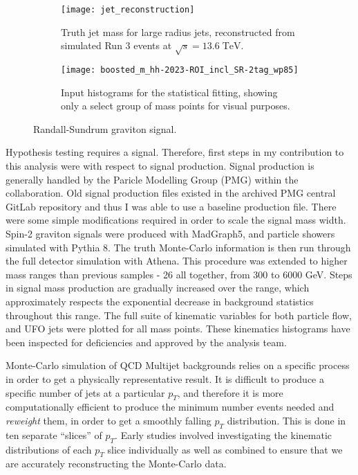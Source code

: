 \documentclass[12pt]{article}
\newcommand{\un}[1]{\;\text{#1}}
\begin{document}
\begin{figure}[t]
    \centering
    \begin{subfigure}[t]{.48\textwidth}
        \centering
        \texttt{[image: jet\_reconstruction]}
        \caption{Truth jet mass for large radius jets, reconstructed from
        simulated Run 3 events at $\sqrt{s}=13.6\un{TeV}$.}
        \label{subfig:jet_reconstruction}
    \end{subfigure}
    \hfill
    \begin{subfigure}[t]{.48\textwidth}
        \centering
        \texttt{[image: boosted\_m\_hh-2023-ROI\_incl\_SR-2tag\_wp85]}
        \caption{Input histograms for the statistical fitting, showing only a
        select group of mass points for visual purposes.}
        \label{subfig:input_hists}
    \end{subfigure}
    \caption{Randall-Sundrum graviton signal.}
\label{fig:my_contributions}
\end{figure}
Hypothesis testing requires a signal. Therefore, first steps in my contribution
to this analysis were with respect to signal production. Signal production is
generally handled by the Paricle Modelling Group (PMG) within the
collaboration. Old signal production files existed in the archived PMG central
GitLab repository and thus I was able to use a baseline production file. There
were some simple modifications required in order to scale the signal mass width.
Spin-2 graviton signals were produced with MadGraph5, and particle showers
simulated with Pythia 8. The truth Monte-Carlo information is then run through
the full detector simulation with Athena. This procedure was extended to higher
mass ranges than previous samples - 26 all together, from 300 to 6000 GeV. Steps
in signal mass production are gradually increased over the range, which
approximately respects the exponential decrease in background statistics
throughout this range. The full suite of kinematic variables for both particle
flow, and UFO jets were plotted for all mass points. These kinematics histograms
have been inspected for deficiencies and approved by the analysis team.

Monte-Carlo simulation of QCD Multijet backgrounds relies on a specific process
in order to get a physically representative result. It is difficult to produce a
specific number of jets at a particular $p_T$, and therefore it is more
computationally efficient to produce the minimum number events needed and
\textit{reweight} them, in order to get a smoothly falling $p_T$ distribution.
This is done in ten separate ``slices'' of $p_T$. Early studies involved
investigating the kinematic distributions of each $p_T$ slice individually as
well as combined to ensure that we are accurately reconstructing the Monte-Carlo
data.
\end{document}
